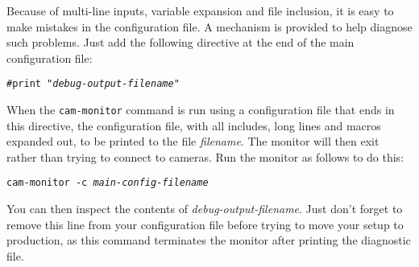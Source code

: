     Because of multi-line inputs, variable expansion and file
    inclusion, it is easy to make mistakes in the configuration
    file.  A mechanism is provided to help diagnose such problems.
    Just add the following directive at the end of the main
    configuration file:

    \texttt{\#print "\emph{debug-output-filename}"}

    When the \texttt{cam-monitor} command is run using a configuration
    file that ends in this directive, the configuration file, with all
    includes, long lines and macros expanded out, to be printed to the
    file \emph{filename}.  The monitor will then exit rather than trying
    to connect to cameras.  Run the monitor as follows to do this:

    \texttt{cam-monitor -c \emph{main-config-filename}}

    You can then inspect the contents of \emph{debug-output-filename}.
    Just don't forget to remove this line from your configuration file
    before trying to move your setup to production, as this command
    terminates the monitor after printing the diagnostic file.

